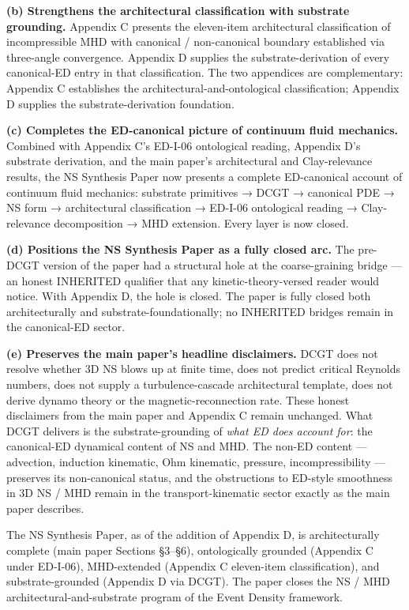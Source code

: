 \documentclass[
]{article}
\begin{document}
\textbf{(b) Strengthens the architectural classification with substrate
grounding.} Appendix C presents the eleven-item architectural
classification of incompressible MHD with canonical / non-canonical
boundary established via three-angle convergence. Appendix D supplies
the substrate-derivation of every canonical-ED entry in that
classification. The two appendices are complementary: Appendix C
establishes the architectural-and-ontological classification; Appendix D
supplies the substrate-derivation foundation.

\textbf{(c) Completes the ED-canonical picture of continuum fluid
mechanics.} Combined with Appendix C's ED-I-06 ontological reading,
Appendix D's substrate derivation, and the main paper's architectural
and Clay-relevance results, the NS Synthesis Paper now presents a
complete ED-canonical account of continuum fluid mechanics: substrate
primitives → DCGT → canonical PDE → NS form → architectural
classification → ED-I-06 ontological reading → Clay-relevance
decomposition → MHD extension. Every layer is now closed.

\textbf{(d) Positions the NS Synthesis Paper as a fully closed arc.} The
pre-DCGT version of the paper had a structural hole at the
coarse-graining bridge --- an honest INHERITED qualifier that any
kinetic-theory-versed reader would notice. With Appendix D, the hole is
closed. The paper is fully closed both architecturally and
substrate-foundationally; no INHERITED bridges remain in the
canonical-ED sector.

\textbf{(e) Preserves the main paper's headline disclaimers.} DCGT does
not resolve whether 3D NS blows up at finite time, does not predict
critical Reynolds numbers, does not supply a turbulence-cascade
architectural template, does not derive dynamo theory or the
magnetic-reconnection rate. These honest disclaimers from the main paper
and Appendix C remain unchanged. What DCGT delivers is the
substrate-grounding of \emph{what ED does account for}: the canonical-ED
dynamical content of NS and MHD. The non-ED content --- advection,
induction kinematic, Ohm kinematic, pressure, incompressibility ---
preserves its non-canonical status, and the obstructions to ED-style
smoothness in 3D NS / MHD remain in the transport-kinematic sector
exactly as the main paper describes.

The NS Synthesis Paper, as of the addition of Appendix D, is
architecturally complete (main paper Sections §3--§6), ontologically
grounded (Appendix C under ED-I-06), MHD-extended (Appendix C
eleven-item classification), and substrate-grounded (Appendix D via
DCGT). The paper closes the NS / MHD architectural-and-substrate program
of the Event Density framework.
\end{document}
